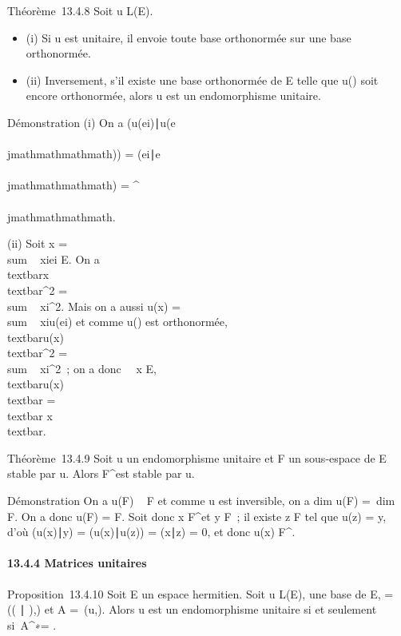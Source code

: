 Théorème~13.4.8 Soit u \in L(E).

\begin{itemize}
\itemsep1pt\parskip0pt
\item
  (i) Si u est unitaire, il envoie toute base orthonormée sur une base
  orthonormée.
\item
  (ii) Inversement, s'il existe une base orthonormée  de E telle que
  u() soit encore orthonormée, alors u est un endomorphisme unitaire.
\end{itemize}

Démonstration (i) On a
(u(ei)∣u(e\\\\jmathmathmathmath)) =
(ei∣e\\\\jmathmathmathmath) =
\deltai^\\\\jmathmathmathmath.

(ii) Soit x = \\sum ~
xiei \in E. On a
\\textbar{}x\\textbar{}^2
= \\sum ~
\textbar{}xi\textbar{}^2. Mais on a aussi u(x)
= \\sum ~
xiu(ei) et comme u() est orthonormée,
\\textbar{}u(x)\\textbar{}^2
= \\sum ~
\textbar{}xi\textbar{}^2~; on a donc
\forall~~x \in E,
\\textbar{}u(x)\\textbar{}
=\\textbar{} x\\textbar{}.

Théorème~13.4.9 Soit u un endomorphisme unitaire et F un sous-espace de
E stable par u. Alors F^\bot est stable par u.

Démonstration On a u(F) \subset~ F et comme u est inversible, on a
dim u(F) =\ dim~ F. On
a donc u(F) = F. Soit donc x \in F^\bot et y \in F~; il existe z \in F
tel que u(z) = y, d'où (u(x)∣y) =
(u(x)∣u(z)) =
(x∣z) = 0, et donc u(x) \in F^\bot.

\paragraph{13.4.4 Matrices unitaires}

Proposition~13.4.10 Soit E un espace hermitien. Soit u \in L(E),  une
base de E, \Omega = \mathrmMat~
(( ∣ ),) et A =\
\mathrmMat (u,). Alors u est un endomorphisme
unitaire si et seulement si~A^∗\OmegaA = \Omega.

